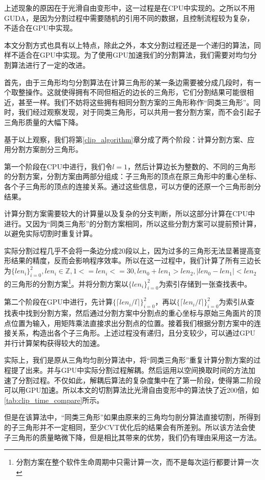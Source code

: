     上述现象的原因在于光滑自由变形中，这一过程是在CPU中实现的。之所以不用GUDA，是因为分割过程中需要随机的引用不同的数据，且控制流程较为复杂，不适合在GPU中实现。

    本文分割方式也具有以上特点，除此之外，本文分割过程还是一个递归的算法，同样不适合在GPU中实现。为了使用GPU加速我们的分割算法，我们需要对均匀分割算法进行了一定的改进。

    首先，由于三角形均匀分割算法在计算三角形的某一条边需要被分成几段时，有一个取整操作。这就使得拥有不同但相近的边长的三角形，它们分割结果可能很相近，甚至一样。我们不妨将这些拥有相同分割方案的三角形称作“同类三角形”。同时，我们经过观察发现，对于同类三角形，可以共用一套分割方案，而不会引起子三角形质量的大幅下降。

    基于以上观察，我们将第\autoref{clip_algorithm}章分成了两个阶段：计算分割方案、应用分割方案剖分三角形。


    第一个阶段在CPU中进行，我们令$l=1$，然后计算边长为整数的、不同的三角形的分割方案，分割方案由两部分组成：子三角形的顶点在原三角形中的重心坐标、各个子三角形的顶点的连接关系。通过这些信息，可以方便的还原一个三角形剖分结果。

    计算分割方案需要较大的计算量以及复杂的分支判断，所以这部分计算在CPU中进行。又因为“同类三角形”的分割方案相同，所以这些分割方案可以提前预计算，以避免实际切割时重复计算。

    实际分割过程几乎不会将一条边分成20段以上，因为过多的三角形无法显著提高变形结果的精度，反而会影响程序效率。所以在这一过程中，我们计算了所有三边长为$\{len_i\}^{2}_{i=0}, len_i \in \mathbb{Z}, 1 <= len_i <= 30, len_0 + len_1 > len_2, |len_0 - len_1| < len_2$的三角形的分割方案\footnote{分割方案在整个软件生命周期中只需计算一次，而不是每次运行都要计算一次}。并将分割方案以$\{len_i\}^{2}_{i=0}$为索引存储到一张查找表中。


    第二个阶段在GPU中进行，先计算$\{\lceil len_i/l \rceil\}^{2}_{i=0}$，再以$\{\lceil len_i/l \rceil\}^{2}_{i=0}$为索引从查找表中找到分割方案，然后通过分割方案中分割点的重心坐标与原始三角面片的顶点位置为输入，用矩阵乘法直接求出分割点的位置。接着我们根据分割方案中的连接关系，构造出各个子三角形。上述过程没有递归，且分支较少，可以通过GPU并行计算架构获得较大的加速。

    实际上，我们是原从三角均匀剖分算法中，将“同类三角形”重复计算分割方案的过程提了出来。并与GPU中实际分割过程解耦。然后运用以空间换取时间的方法加速了分割过程。不仅如此，解耦后算法的复杂度集中在了第一阶段，使得第二阶段可以用GPU加速。所以本文的切割算法比光滑自由变形中的算法快了近200倍，如\autoref{tab:clip_time_compare}所示。

    但是在该算法中，“同类三角形”如果由原来的三角均匀剖分算法直接切割，所得到的子三角形并不一定相同，至少CVT优化后的结果会有所差别。所以该方法会使子三角形的质量略微下降，但是相比其带来的优势，我们仍有理由采用这一方法。
